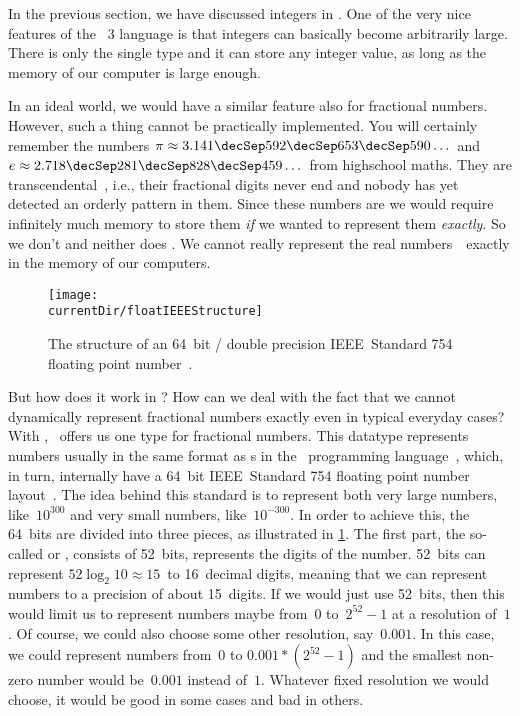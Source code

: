 %
\label{sec:floats}%
%
In the previous section, we have discussed integers in \python.
One of the very nice features of the \python~3 language is that integers can basically become arbitrarily large.
There is only the single type  and it can store any integer value, as long as the memory of our computer is large enough.%
%
\begin{sloppypar}%
In an ideal world, we would have a similar feature also for fractional numbers.
However, such a thing cannot be practically implemented.
You will certainly remember the numbers $\pi\approx3.141\decSep592\decSep653\decSep590\dots$ and $e\approx2.718\decSep281\decSep828\decSep459\dots$ from highschool maths.
They are transcendental~\cite{N1939TTOP,APM1991TOEAP,F2011TTOEAP}, i.e., their fractional digits never end and nobody has yet detected an orderly pattern in them.
Since these numbers are  we would require infinitely much memory to store them \emph{if} we wanted to represent them \emph{exactly}.
So we don't and neither does \python.
We cannot really represent the real numbers~\realNumbers\ exactly in the memory of our computers.%
\end{sloppypar}%
%
%
\label{sec:howFloatingPointNumbersWork}%
%
\begin{figure}%
\centering%
\texttt{[image: \\currentDir/floatIEEEStructure]}%
\caption{The structure of an 64~bit / double precision IEEE~Standard 754 floating point number~\cite{IEEE2019ISFFPA,H1997IS7FPN}.}%
\label{fig:floatIEEEStructure}%
\end{figure}%
%
But how does it work in \python?
How can we deal with the fact that we cannot dynamically represent fractional numbers exactly even in typical everyday cases?
With , \python\ offers us one type for fractional numbers.
This datatype represents numbers usually in the same format as s in the ~programming language~\cite{PSF2024NTIFC}, which, in turn, internally have a 64~bit IEEE~Standard 754 floating point number layout~\cite{IEEE2019ISFFPA,H1997IS7FPN}.
The idea behind this standard is to represent both very large numbers, like~$10^{300}$ and very small numbers, like~$10^{-300}$.
In order to achieve this, the 64~bits are divided into three pieces, as illustrated in \cref{fig:floatIEEEStructure}.
%
%
%
The first part, the so-called  or , consists of 52~bits, represents the digits of the number.
52~bits can represent $52\log_2 10\approx 15$~to 16~decimal digits, meaning that we can represent numbers to a precision of about 15~digits.
If we would just use 52~bits, then this would limit us to represent numbers maybe from~$0$ to~$2^{52}-1$ at a resolution of~$1$.
Of course, we could also choose some other resolution, say~$0.001$.
In this case, we could represent numbers from~$0$ to $0.001*(2^{52}-1)$ and the smallest non-zero number would be~$0.001$ instead of~$1$.
Whatever fixed resolution we would choose, it would be good in some cases and bad in others.

